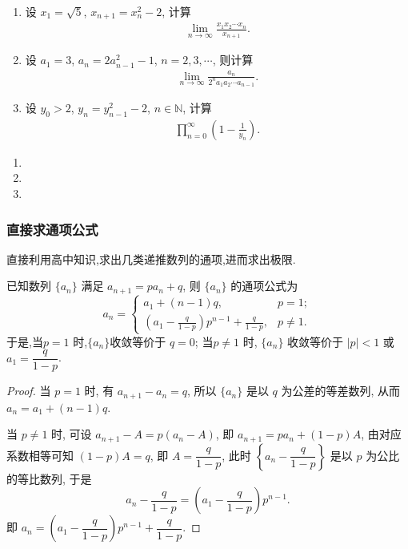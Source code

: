 \documentclass[../../main.tex]{subfiles}%
\begin{document}
\begin{example}
\begin{enumerate}
\item 设 $x_1 = \sqrt{5}$, $x_{n+1} = x_n^2 - 2$, 计算
\begin{align*}
\lim_{n \to \infty} \frac{x_1 x_2 \cdots x_n}{x_{n+1}}.
\end{align*}
\item 设 $a_1 = 3$, $a_n = 2a_{n-1}^2 - 1$, $n = 2, 3, \cdots$, 则计算
\begin{align*}
\lim_{n \to \infty} \frac{a_n}{2^n a_1 a_2 \cdots a_{n-1}}.
\end{align*}
\item 设 $y_0 > 2$, $y_n = y_{n-1}^2 - 2$, $n \in \mathbb{N}$, 计算
\begin{align*}
\prod_{n=0}^{\infty} \left(1 - \frac{1}{y_n}\right).
\end{align*}
\end{enumerate}
\end{example}
\begin{solution}
\begin{enumerate}
\item 

\item 

\item 
\end{enumerate}

\end{solution}


\subsubsection{直接求通项公式}

直接利用高中知识,求出几类递推数列的通项,进而求出极限.

\begin{proposition}\label{proposition:可直接求通项--类型一}
已知数列 $\{a_n\}$ 满足 $a_{n+1} = p a_n + q$, 则 $\{a_n\}$ 的通项公式为
\[
a_n = 
\begin{cases} 
a_1 + (n - 1)q, & p = 1; \\
\displaystyle \left( a_1 - \frac{q}{1 - p} \right) p^{n - 1} + \frac{q}{1 - p}, & p \neq 1.
\end{cases}
\]
于是,当$p = 1$ 时,$\{a_n\}$收敛等价于 $q = 0$;
当$p \neq 1$ 时, $\{a_n\}$ 收敛等价于 $|p| < 1$ 或 $a_1 = \dfrac{q}{1 - p}$.
\end{proposition}
\begin{proof}

当 $p = 1$ 时, 有 $a_{n + 1} - a_n = q$, 所以 $\{a_n\}$ 是以 $q$ 为公差的等差数列, 从而 $a_n = a_1 + (n - 1)q$.

当 $p \neq 1$ 时, 可设 $a_{n + 1} - A = p(a_n - A)$, 即 $a_{n + 1} = p a_n + (1 - p)A$, 由对应系数相等可知 $(1 - p)A = q$, 即 $A = \dfrac{q}{1 - p}$, 此时 $\left\{ a_n - \dfrac{q}{1 - p} \right\}$ 是以 $p$ 为公比的等比数列, 于是
\[
a_n - \frac{q}{1 - p} = \left( a_1 - \frac{q}{1 - p} \right) p^{n - 1}.
\]
即 $a_n = \left( a_1 - \dfrac{q}{1 - p} \right) p^{n - 1} + \dfrac{q}{1 - p}$. 

\end{proof}
\end{document}
